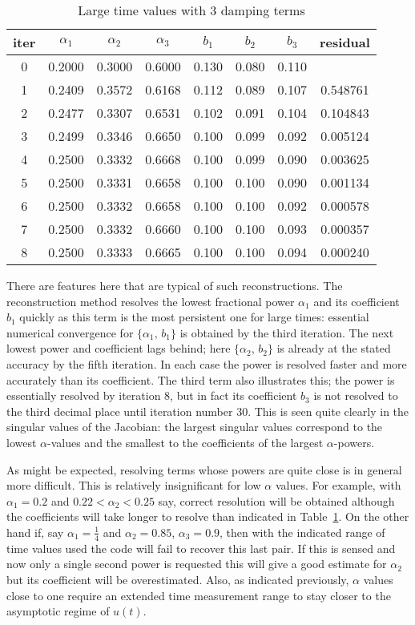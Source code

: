 \begin{table}[ht]
\centering
\footnotesize
\begin{tabular}{|c|c|c|c|c|c|c|c|}
\hline
iter & $\alpha_1$ & $\alpha_2$ & $\alpha_3$ & $b_1$ & $b_2$ & $b_3$ & residual\\
\hline
0 & 0.2000 & 0.3000 & 0.6000 & 0.130 & 0.080 & 0.110 &\\			%
1 & 0.2409 & 0.3572 & 0.6168 & 0.112 & 0.089 & 0.107 & 0.548761\\
2 & 0.2477 & 0.3307 & 0.6531 & 0.102 & 0.091 & 0.104 & 0.104843\\
3 & 0.2499 & 0.3346 & 0.6650 & 0.100 & 0.099 & 0.092 & 0.005124\\
4 & 0.2500 & 0.3332 & 0.6668 & 0.100 & 0.099 & 0.090 & 0.003625\\
5 & 0.2500 & 0.3331 & 0.6658 & 0.100 & 0.100 & 0.090 & 0.001134\\
6 & 0.2500 & 0.3332 & 0.6658 & 0.100 & 0.100 & 0.092 & 0.000578\\
7 & 0.2500 & 0.3332 & 0.6660 & 0.100 & 0.100 & 0.093 & 0.000357\\
8 & 0.2500 & 0.3333 & 0.6665 & 0.100 & 0.100 & 0.094 & 0.000240\\
\hline
\end{tabular}
\small
\caption{Large time values with 3 damping terms}
 \label{Table:large_tt}
\end{table}

There are features here that are typical of such reconstructions.
The reconstruction method resolves the lowest fractional power $\alpha_1$
and its coefficient $b_1$ quickly as this term is the most persistent one
for large times:
essential numerical convergence for $\{\alpha_1,\,b_1\}$ is obtained
by the third iteration.
The next lowest power and coefficient lags behind; here $\{\alpha_2,\,b_2\}$ is already at the stated accuracy by the fifth iteration.
In each case the power is resolved faster and more accurately than its
coefficient.
The third term also illustrates this;  the power is essentially resolved by
iteration 8, but in fact its coefficient $b_3$ is not resolved to the third
decimal place until iteration number 30.
This is seen quite clearly in the singular values of the Jacobian:
the largest singular values correspond to the lowest $\alpha$-values
and the smallest to the coefficients of the largest $\alpha$-powers.

As might be expected, resolving terms whose powers are quite close is
in general more difficult.
This is relatively insignificant for low $\alpha$ values.
For example, with $\alpha_1=0.2$ and $0.22<\alpha_2<0.25$ say, correct
resolution will be obtained although the coefficients will take longer to
resolve than indicated in Table~\ref{Table:large_tt}.
On the other hand if, say $\alpha_1=\frac{1}{4}$ and $\alpha_2=0.85$,
$\alpha_3=0.9$, then with the indicated range of time values used the code
will fail to recover this last pair.
If this is sensed and now only a single second power is requested
this will give a good estimate for $\alpha_2$ but its coefficient will
be overestimated.
Also, as indicated previously, $\alpha$ values close to one require
an extended time measurement range to stay closer to the asymptotic regime of $u(t)$.

